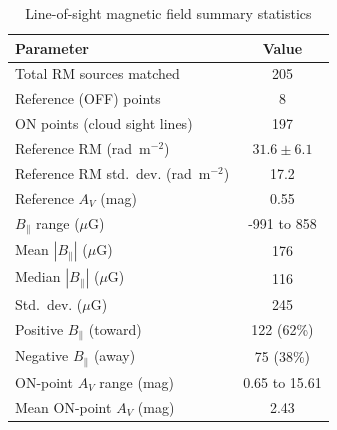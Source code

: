 \begin{table}[htbp]
\centering
\caption{Line-of-sight magnetic field summary statistics}
\label{tab:blos-summary}
\begin{tabular}{lc}
\toprule
Parameter & Value \\
\midrule
Total RM sources matched & 205 \\
Reference (OFF) points & 8 \\
ON points (cloud sight lines) & 197 \\
\midrule
Reference RM (rad~m$^{-2}$) & $31.6 \pm 6.1$ \\
Reference RM std.\ dev. (rad~m$^{-2}$) & 17.2 \\
Reference $A_V$ (mag) & 0.55 \\
\midrule
$B_\parallel$ range ($\mu$G) & -991 to 858 \\
Mean $|B_\parallel|$ ($\mu$G) & 176 \\
Median $|B_\parallel|$ ($\mu$G) & 116 \\
Std.\ dev. ($\mu$G) & 245 \\
\midrule
Positive $B_\parallel$ (toward) & 122 (62\%) \\
Negative $B_\parallel$ (away) & 75 (38\%) \\
\midrule
ON-point $A_V$ range (mag) & 0.65 to 15.61 \\
Mean ON-point $A_V$ (mag) & 2.43 \\
\bottomrule
\end{tabular}
\end{table}
